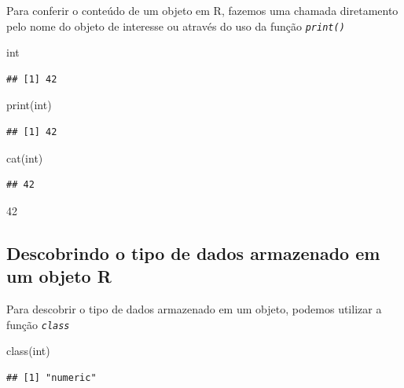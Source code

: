\documentclass[
]{article}
\newenvironment{Shaded}{\begin{snugshade}}{\end{snugshade}}
\newcommand{\FunctionTok}[1]{\textcolor[rgb]{0.00,0.00,0.00}{#1}}
\newcommand{\NormalTok}[1]{#1}
\begin{document}
Para conferir o conteúdo de um objeto em R, fazemos uma chamada
diretamento pelo nome do objeto de interesse ou através do uso da função
\emph{\texttt{print()}}

\begin{Shaded}
\begin{Highlighting}[]
\NormalTok{int}
\end{Highlighting}
\end{Shaded}

\begin{verbatim}
## [1] 42
\end{verbatim}

\begin{Shaded}
\begin{Highlighting}[]
\FunctionTok{print}\NormalTok{(int)}
\end{Highlighting}
\end{Shaded}

\begin{verbatim}
## [1] 42
\end{verbatim}

\begin{Shaded}
\begin{Highlighting}[]
\FunctionTok{cat}\NormalTok{(int)}
\end{Highlighting}
\end{Shaded}

\begin{verbatim}
## 42
\end{verbatim}

42

\hypertarget{descobrindo-o-tipo-de-dados-armazenado-em-um-objeto-r}{%
\subsection{Descobrindo o tipo de dados armazenado em um objeto
R}\label{descobrindo-o-tipo-de-dados-armazenado-em-um-objeto-r}}

Para descobrir o tipo de dados armazenado em um objeto, podemos utilizar
a função \emph{\texttt{class}}

\begin{Shaded}
\begin{Highlighting}[]
\FunctionTok{class}\NormalTok{(int)}
\end{Highlighting}
\end{Shaded}

\begin{verbatim}
## [1] "numeric"
\end{verbatim}
\end{document}
